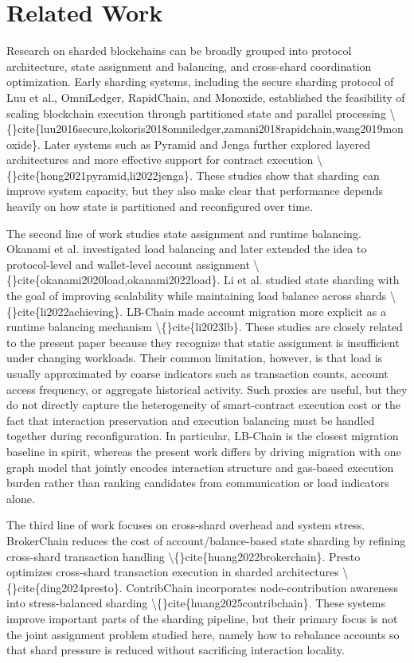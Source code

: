 \documentclass{article}
\begin{document}
\section{Related Work}\label{sec:related-work}

Research on sharded blockchains can be broadly grouped into protocol architecture, state assignment and balancing, and cross-shard coordination optimization. Early sharding systems, including the secure sharding protocol of Luu et al., OmniLedger, RapidChain, and Monoxide, established the feasibility of scaling blockchain execution through partitioned state and parallel processing \textbackslash\{\}cite\{luu2016secure,kokoris2018omniledger,zamani2018rapidchain,wang2019monoxide\}. Later systems such as Pyramid and Jenga further explored layered architectures and more effective support for contract execution \textbackslash\{\}cite\{hong2021pyramid,li2022jenga\}. These studies show that sharding can improve system capacity, but they also make clear that performance depends heavily on how state is partitioned and reconfigured over time.

The second line of work studies state assignment and runtime balancing. Okanami et al. investigated load balancing and later extended the idea to protocol-level and wallet-level account assignment \textbackslash\{\}cite\{okanami2020load,okanami2022load\}. Li et al. studied state sharding with the goal of improving scalability while maintaining load balance across shards \textbackslash\{\}cite\{li2022achieving\}. LB-Chain made account migration more explicit as a runtime balancing mechanism \textbackslash\{\}cite\{li2023lb\}. These studies are closely related to the present paper because they recognize that static assignment is insufficient under changing workloads. Their common limitation, however, is that load is usually approximated by coarse indicators such as transaction counts, account access frequency, or aggregate historical activity. Such proxies are useful, but they do not directly capture the heterogeneity of smart-contract execution cost or the fact that interaction preservation and execution balancing must be handled together during reconfiguration. In particular, LB-Chain is the closest migration baseline in spirit, whereas the present work differs by driving migration with one graph model that jointly encodes interaction structure and gas-based execution burden rather than ranking candidates from communication or load indicators alone.

The third line of work focuses on cross-shard overhead and system stress. BrokerChain reduces the cost of account/balance-based state sharding by refining cross-shard transaction handling \textbackslash\{\}cite\{huang2022brokerchain\}. Presto optimizes cross-shard transaction execution in sharded architectures \textbackslash\{\}cite\{ding2024presto\}. ContribChain incorporates node-contribution awareness into stress-balanced sharding \textbackslash\{\}cite\{huang2025contribchain\}. These systems improve important parts of the sharding pipeline, but their primary focus is not the joint assignment problem studied here, namely how to rebalance accounts so that shard pressure is reduced without sacrificing interaction locality.
\end{document}
